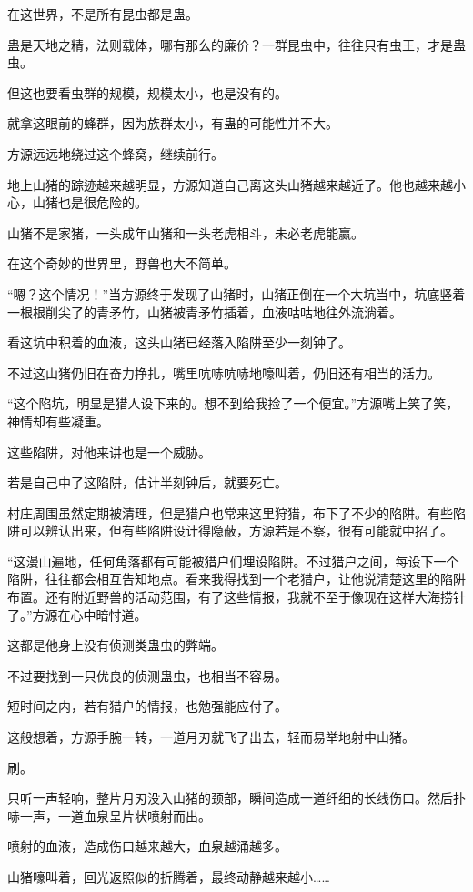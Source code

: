 \begin{this_body}
在这世界，不是所有昆虫都是蛊。

蛊是天地之精，法则载体，哪有那么的廉价？一群昆虫中，往往只有虫王，才是蛊虫。

但这也要看虫群的规模，规模太小，也是没有的。

就拿这眼前的蜂群，因为族群太小，有蛊的可能性并不大。

方源远远地绕过这个蜂窝，继续前行。

地上山猪的踪迹越来越明显，方源知道自己离这头山猪越来越近了。他也越来越小心，山猪也是很危险的。

山猪不是家猪，一头成年山猪和一头老虎相斗，未必老虎能赢。

在这个奇妙的世界里，野兽也大不简单。

“嗯？这个情况！”当方源终于发现了山猪时，山猪正倒在一个大坑当中，坑底竖着一根根削尖了的青矛竹，山猪被青矛竹插着，血液咕咕地往外流淌着。

看这坑中积着的血液，这头山猪已经落入陷阱至少一刻钟了。

不过这山猪仍旧在奋力挣扎，嘴里吭哧吭哧地嚎叫着，仍旧还有相当的活力。

“这个陷坑，明显是猎人设下来的。想不到给我捡了一个便宜。”方源嘴上笑了笑，神情却有些凝重。

这些陷阱，对他来讲也是一个威胁。

若是自己中了这陷阱，估计半刻钟后，就要死亡。

村庄周围虽然定期被清理，但是猎户也常来这里狩猎，布下了不少的陷阱。有些陷阱可以辨认出来，但有些陷阱设计得隐蔽，方源若是不察，很有可能就中招了。

“这漫山遍地，任何角落都有可能被猎户们埋设陷阱。不过猎户之间，每设下一个陷阱，往往都会相互告知地点。看来我得找到一个老猎户，让他说清楚这里的陷阱布置。还有附近野兽的活动范围，有了这些情报，我就不至于像现在这样大海捞针了。”方源在心中暗忖道。

这都是他身上没有侦测类蛊虫的弊端。

不过要找到一只优良的侦测蛊虫，也相当不容易。

短时间之内，若有猎户的情报，也勉强能应付了。

这般想着，方源手腕一转，一道月刃就飞了出去，轻而易举地射中山猪。

刷。

只听一声轻响，整片月刃没入山猪的颈部，瞬间造成一道纤细的长线伤口。然后扑哧一声，一道血泉呈片状喷射而出。

喷射的血液，造成伤口越来越大，血泉越涌越多。

山猪嚎叫着，回光返照似的折腾着，最终动静越来越小……


\end{this_body}
